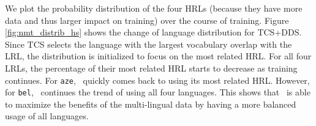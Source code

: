
We plot the probability distribution of the four HRLs (because they have more data and thus larger impact on training) over the course of training.  Figure \ref{fig:nmt_distrib_hs} shows the change of language distribution for TCS+DDS. Since TCS selects the language with the largest vocabulary overlap with the LRL, the distribution is initialized to focus on the most related HRL. For all four LRLs, the percentage of their most related HRL starts to decrease as training continues. For \texttt{aze}, \dds~quickly comes back to using its most related HRL. However, for \texttt{bel}, \dds~continues the trend of using all four languages. This shows that \dds~is able to maximize the benefits of the multi-lingual data by having a more balanced usage of all languages. 

